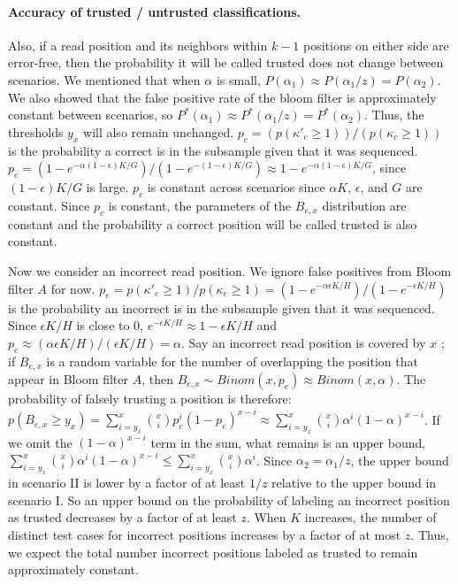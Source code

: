 \documentclass[10pt]{article}
\begin{document}
\paragraph{Accuracy of trusted / untrusted classifications.}
Also, if a read position and its neighbors within $k-1$ positions on either side are error-free, then the probability it will be called trusted does not change between scenarios.  We mentioned that when $\alpha$ is small, $P(\alpha_1) \approx P(\alpha_1/z) = P(\alpha_2)$.  We also showed that the false positive rate of the bloom filter is approximately constant between scenarios, so $P^*(\alpha_1) \approx P^*(\alpha_1/z) = P^*(\alpha_2)$.  Thus, the thresholds $y_x$ will also remain unchanged.
$p_c=(p(\kappa'_c\ge 1))/(p(\kappa_c\ge 1))$ is the probability a correct \kmer is in the subsample given that it was sequenced.
$p_c=(1-e^{-\alpha(1-\epsilon) K/G})/(1-e^{-(1-\epsilon) K/G})\approx 1-e^{-\alpha(1-\epsilon)K/G}$, since $(1-\epsilon)K/G$ is large.
$p_c$ is constant across scenarios since $\alpha K$, $\epsilon$, and $G$ are constant.
Since $p_c$ is constant, the parameters of the $B_{e,x}$ distribution are constant and the probability a correct position will be called trusted is also constant.

Now we consider an incorrect read position.  We ignore false positives from Bloom filter $A$ for now.
$p_e = p(\kappa'_e\ge 1)/p(\kappa_e\ge 1) = (1-e^{-\alpha\epsilon K/H})/(1-e^{-\epsilon K/H})$ is the probability an incorrect \kmer is in the subsample given that it was sequenced.
Since $\epsilon K/H$ is close to 0, $e^{-\epsilon K/H}\approx 1-\epsilon K/H$ and $p_e \approx (\alpha \epsilon K/H)/(\epsilon K/H)=\alpha$.
Say an incorrect read position is covered by $x$ \kmers; if $B_{e,x}$ is a random variable for the number of \kmers overlapping the position that appear in Bloom filter $A$, then $B_{e,x} \sim Binom(x, p_e) \approx Binom(x, \alpha)$.  The probability of falsely trusting a position is therefore: 
$p(B_{e, x}\geq y_x)=\sum_{i=y_x}^x \binom{x}{i} p_e^i(1-p_e)^{x-i} \approx \sum_{i=y_x}^x \binom{x}{i} \alpha^i(1-\alpha)^{x-i}$.  If we omit the $(1-\alpha)^{x-i}$ term in the sum, what remains is an upper bound, \thatis $\sum_{i=y_x}^x \binom{x}{i} \alpha^i(1-\alpha)^{x-i} \leq \sum_{i=y_x}^x \binom{x}{i} \alpha^i$.  Since $\alpha_2 = \alpha_1/z$, the upper bound in scenario II is lower by a factor of at least $1/z$ relative to the upper bound in scenario I.  So an upper bound on the probability of labeling an incorrect position as trusted decreases by a factor of at least $z$.  When $K$ increases, the number of distinct test cases for incorrect positions increases by a factor of at most $z$.  Thus, we expect the total number incorrect positions labeled as trusted to remain approximately constant.
\end{document}
